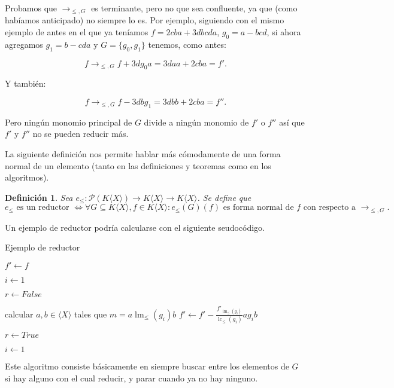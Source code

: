 \documentclass[12pt]{report}
\theoremstyle{customstyle}
\newtheorem{definition}[theorem]{Definición}
\theoremstyle{factstyle}
\DeclareMathOperator{\sop}{sop}
\DeclareMathOperator{\lm}{lm}
\DeclareMathOperator{\lc}{lc}
\begin{document}
Probamos que $→_{≤, G}$ es terminante, pero no que sea confluente, ya que (como habíamos anticipado) no siempre lo es. Por ejemplo, siguiendo con el mismo ejemplo de antes en el que ya teníamos $f = 2 cba + 3 dbcda$, $g_0 = a - bcd$, si ahora agregamos $g_1 = b - cda$ y $G = \{g_0, g_1\}$ tenemos, como antes:

\[f →_{≤, G} f + 3d g_0 a = 3 daa + 2 cba = f' \text{.}\]

\noindent Y también:

\[f →_{≤, G} f - 3db g_1 = 3 dbb + 2 cba = f'' \text{.}\]

\noindent Pero ningún monomio principal de $G$ divide a ningún monomio de $f'$ o $f''$ así que $f'$ y $f''$ no se pueden reducir más.

La siguiente definición nos permite hablar más cómodamente de una forma normal de un elemento (tanto en las definiciones y teoremas como en los algoritmos).

\begin{definition}\label{def:reductor}
  Sea $e_≤ : 𝒫(K⟨X⟩) → K⟨X⟩ → K⟨X⟩$. Se define que
  \[ e_≤\text{ es un reductor }⇔ ∀G ⊆ K⟨X⟩, f ∈ K⟨X⟩ : e_≤(G)(f)\text{ es forma normal de }f\text{ con respecto a }→_{≤, G} \text{.} \]
\end{definition}

Un ejemplo de reductor podría calcularse con el siguiente seudocódigo.

\begin{algorithm}[H] %
  \caption{Ejemplo de reductor}\label{alg:reductor}
  $f' ← f$

  $i ← 1$

   {
    $r ← False$

    \For{$m ∈ \sop(f')$} {
      \If{$\lm_≤(g_i) | m$} {
        calcular $a, b ∈ ⟨X⟩$ tales que $m = a \lm_≤(g_i) b$
        $f' ← f' - \frac{f'_{\lm_≤(g_i)}}{\lc_≤(g_i)}a g_i b$

        $r ← True$

        \Break
      }
    }

     {
      $i ← 1$
    } 
  }
\end{algorithm}

Este algoritmo consiste básicamente en siempre buscar entre los elementos de $G$ si hay alguno con el cual reducir, y parar cuando ya no hay ninguno.
\end{document}
